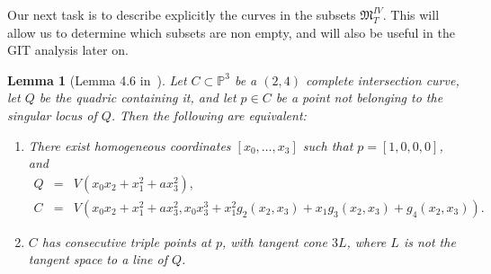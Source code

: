 \documentclass[11pt]{amsart}
\numberwithin{equation}{section}
\theoremstyle{plain}
\newtheorem{lemma}[theorem]{Lemma}
\theoremstyle{remark}
\theoremstyle{definition}
\newcommand{\gM}{\mathfrak{M}}
\newcommand{\PP}{{\mathbb P}}
\begin{document}
Our next task is to describe explicitly the curves in the  subsets $\gM^{IV}_T$. This will allow us to determine which subsets are non empty, and  will also be useful in the GIT analysis later on.
%
\begin{lemma}[Lemma 4.6 in~\cite{shah4}]\label{lmm:norm3}
%
Let $C\subset\PP^3$ be a $(2,4)$ complete intersection curve,  let $Q$ be the quadric containing it, and let $p\in C$ be a point \emph{not} belonging to the singular locus of  $Q$. Then the following are equivalent:
%
\begin{enumerate}
%
\item 
%
There exist  homogeneous coordinates $[x_0,\ldots,x_3]$ such that $p=[1,0,0,0]$,  and 
%
\begin{eqnarray}
%
Q & = & V(x_0x_2+x_1^2+ax_3^2), \\
%
C & = &  V(x_0x_2+x_1^2+ax_3^2, x_0x_3^3+x_1^2g_2(x_2,x_3)+x_1g_3(x_2,x_3)+g_4(x_2,x_3)). \label{norm3}
%
\end{eqnarray}
%
%
\item 
%
 $C$ has consecutive triple points at $p$, with tangent cone $3L$, where $L$ is  \emph{not} the tangent space to  a line of $Q$. 
%
\end{enumerate}
%
\end{lemma}
%
\end{document}
